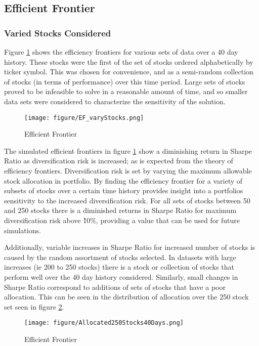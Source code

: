 \subsection{Efficient Frontier}

\subsubsection{Varied Stocks Considered}

Figure \ref{fig:frontier} shows the efficiency frontiers for various sets of data over a 40 day history. These stocks were the first of the set of stocks ordered alphabetically by ticker symbol. This was chosen for convenience, and as a semi-random collection of stocks (in terms of performance) over this time period. Large sets of stocks proved to be infeasible to solve in a reasonable amount of time, and so smaller data sets were considered to characterize the sensitivity of the solution.

\begin{figure}[H]
\centering
\texttt{[image: figure/EF\_varyStocks.png]}\\
\caption{Efficient Frontier\label{fig:frontier}}
\end{figure}

The simulated efficient frontiers in figure \ref{fig:frontier} show a diminishing return in Sharpe Ratio as diversification risk is increased; as is expected from the theory of efficiency frontiers.  Diversification risk is set by varying the maximum allowable stock allocation in portfolio.  By finding the efficiency frontier for a variety of subsets of stocks over a certain time history provides insight into a portfolios sensitivity to the increased diversification risk. For all sets of stocks between 50 and 250 stocks there is a diminished returns in Sharpe Ratio for maximum diversification risk above \~10\%, providing a value that can be used for future simulations.

Additionally, variable increases in Sharpe Ratio for increased number of stocks is caused by the random assortment of stocks selected. In datasets with large increases (ie 200 to 250 stocks) there is a stock or collection of stocks that perform well over the 40 day history considered. Similarly, small changes in Sharpe Ratio correspond to additions of sets of stocks that have a poor allocation. This can be seen in the distribution of allocation over the 250 stock set seen in figure \ref{fig:250all}.


\begin{figure}[H]
\centering
\texttt{[image: figure/Allocated250Stocks40Days.png]}\\
\caption{Efficient Frontier\label{fig:250all}}
\end{figure}

